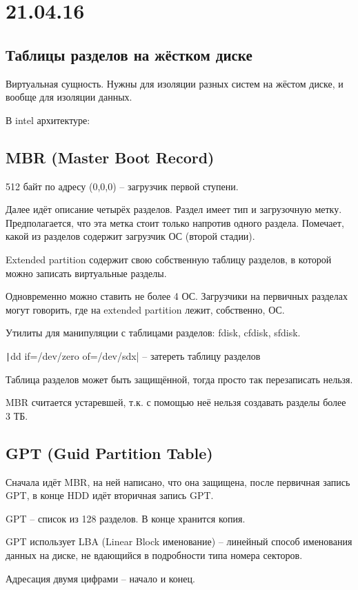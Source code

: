 \documentclass[a4paper,10pt]{article}
\begin{document}
\section{21.04.16}
\subsection{Таблицы разделов на жёстком диске}
Виртуальная сущность. Нужны для изоляции разных систем на жёстом диске, и вообще для изоляции данных.

В intel архитектуре:

\subsection{MBR (Master Boot Record)}
512 байт по адресу (0,0,0)  -- загрузчик первой ступени.

Далее идёт описание четырёх разделов. Раздел имеет тип и загрузочную метку. Предполагается, что эта метка стоит только напротив одного раздела. Помечает, какой из разделов содержит загрузчик ОС (второй стадии).

Extended partition содержит свою собственную таблицу разделов, в которой можно записать виртуальные разделы.

Одновременно можно ставить не более 4 ОС. Загрузчики на первичных разделах могут говорить, где на extended partition лежит, собственно, ОС.

Утилиты для манипуляции с таблицами разделов: fdisk, cfdisk, sfdisk.

\texttt|dd if=/dev/zero of=/dev/sdx|  -- затереть таблицу разделов

Таблица разделов может быть защищённой, тогда просто так перезаписать нельзя.

MBR считается устаревшей, т.к. с помощью неё нельзя создавать разделы более 3 ТБ.

\subsection{GPT (Guid Partition Table)}
Сначала идёт MBR, на ней написано, что она защищена, после первичная запись GPT, в конце HDD идёт вторичная запись GPT.

GPT -- список из 128 разделов. В конце хранится копия.

GPT использует LBA (Linear Block именование) -- линейный способ именования данных на диске, не вдающийся в подробности типа номера секторов.

Адресация двумя цифрами -- начало и конец.
\end{document}
